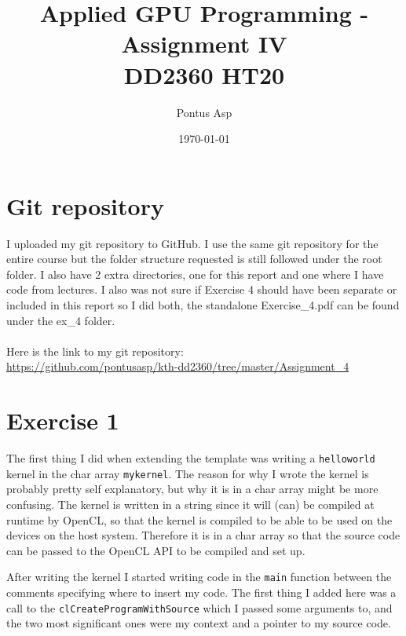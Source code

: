 \documentclass[a4paper, 12pt]{article}
\def\code#1{\texttt{#1}}
\begin{document}
\title{\vspace{4.0cm}Applied GPU Programming - Assignment IV\\
\large DD2360 HT20}
\author{Pontus Asp}
\date{\today}
\maketitle
\thispagestyle{empty}
\newpage

\clearpage
{}

\section{Git repository}
I uploaded my git repository to GitHub. I use the same git repository for the entire course but the folder structure requested is still followed under the root folder. I also have 2 extra directories, one for this report and one where I have code from lectures. I also was not sure if Exercise 4 should have been separate or included in this report so I did both, the standalone Exercise\_4.pdf can be found under the ex\_4 folder.
\\\\
Here is the link to my git repository:\\
\url{https://github.com/pontusasp/kth-dd2360/tree/master/Assignment_4}

\section{Exercise 1}
The first thing I did when extending the template was writing a \code{helloworld} kernel in the char array \code{mykernel}. The reason for why I wrote the kernel is probably pretty self explanatory, but why it is in a char array might be more confusing. The kernel is written in a string since it will (can) be compiled at runtime by OpenCL, so that the kernel is compiled to be able to be used on the devices on the host system. Therefore it is in a char array so that the source code can be passed to the OpenCL API to be compiled and set up.

After writing the kernel I started writing code in the \code{main} function between the comments specifying where to insert my code. The first thing I added here was a call to the \code{clCreateProgramWithSource} which I passed some arguments to, and the two most significant ones were my context and a pointer to my source code.
\end{document}
